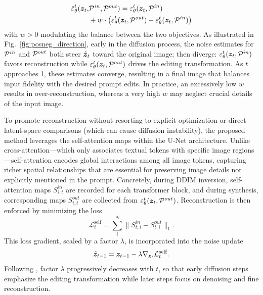 \begin{align}
  \label{eq:cfg}
    \begin{split}
      \tilde{\varepsilon}_{\theta}^{t}({\bm{z}}_{t},&{{\mathcal{P}}^{in}},{{\mathcal{P}}^{out}})= \varepsilon_{\theta}^{t}({\bm{z}}_{t},{{\mathcal{P}}^{in}})\\
      &+ w \cdot \left( \varepsilon_{\theta}^{t}({\bm{z}}_{t},{{\mathcal{P}}^{out}}) - \varepsilon_{\theta}^{t}({\bm{z}}_{t},{{\mathcal{P}}^{in}}) \right) 
    \end{split}
\end{align}
with $w>0$ modulating the balance between the two objectives. As illustrated in Fig.~\ref{fig:posneg_direction}, early in the diffusion process, the noise estimates for ${{\mathcal{P}}^{in}}$ and ${{\mathcal{P}}^{out}}$ both steer $\hat{{\bm{z}}}_t$ toward the original image; then diverge: $\varepsilon_{\theta}^{t}({\bm{z}}_{t},{{\mathcal{P}}^{in}})$ favors reconstruction while $\varepsilon_{\theta}^{t}({\bm{z}}_{t},{{\mathcal{P}}^{out}})$ drives the editing transformation. 
As $t$ approaches 1, these estimates converge, resulting in a final image that balances input fidelity with the desired prompt edits.
In practice, an excessively low $w$ results in over-reconstruction, whereas a very high $w$ may neglect crucial details of the input image.

To promote reconstruction without resorting to explicit optimization or direct latent-space comparisons (which can cause diffusion instability), {\modified{}the proposed method leverages} the self-attention maps within the U-Net architecture. Unlike cross-attention—which only associates textual tokens with specific image regions \cite{hertz2023prompt,han2023proximal}—self-attention encodes global interactions among all image tokens, capturing richer spatial relationships that are essential for preserving image details not explicitly mentioned in the prompt. Concretely, during DDIM inversion, {\modified{}self-attention maps} $S_{i,t}^{in}$ {\modified{}are recorded} for each transformer block, and during synthesis, {\modified{}corresponding maps} $S_{i,t}^{out}$ {\modified{}are collected} from $\varepsilon_{\theta}^{t}({\bm{z}}_{t},{{\mathcal{P}}^{out}})$. {\modified{}Reconstruction is then enforced} by minimizing the loss
\begin{equation}
    \label{eq:self_attention_guidance}
    \mathcal{L}^\text{self}_t =  \sum^N_i \|S_{t,i}^{in} - S_{t,i}^{out}\|_1.
\end{equation}
This loss gradient, scaled by a factor $\lambda$, is incorporated into the noise update
\begin{equation}
    \hat{{\bm{z}}}_{t-1} = {\bm{z}}_{t-1} - \lambda \nabla_{{\bm{z}}_t}\mathcal{L}^\text{self}_t.
\end{equation}
Following \cite{couairon2023monotonical}, {\modified{}factor} $\lambda$ progressively decreases with $t$, so that early diffusion steps emphasize the editing transformation while later steps focus on denoising and fine reconstruction.

